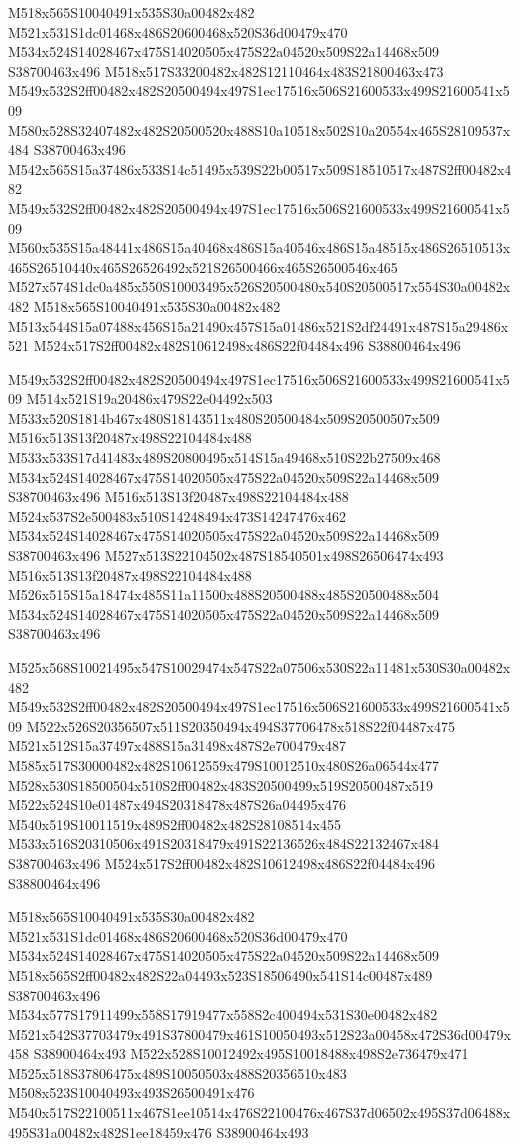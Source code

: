 \documentclass{article}
\begin{document}
\begin{multicols}{2}
M518x565S10040491x535S30a00482x482 M521x531S1dc01468x486S20600468x520S36d00479x470 M534x524S14028467x475S14020505x475S22a04520x509S22a14468x509 S38700463x496 M518x517S33200482x482S12110464x483S21800463x473 M549x532S2ff00482x482S20500494x497S1ec17516x506S21600533x499S21600541x509 M580x528S32407482x482S20500520x488S10a10518x502S10a20554x465S28109537x484 S38700463x496 M542x565S15a37486x533S14c51495x539S22b00517x509S18510517x487S2ff00482x482 M549x532S2ff00482x482S20500494x497S1ec17516x506S21600533x499S21600541x509 M560x535S15a48441x486S15a40468x486S15a40546x486S15a48515x486S26510513x465S26510440x465S26526492x521S26500466x465S26500546x465 M527x574S1dc0a485x550S10003495x526S20500480x540S20500517x554S30a00482x482 M518x565S10040491x535S30a00482x482 M513x544S15a07488x456S15a21490x457S15a01486x521S2df24491x487S15a29486x521 M524x517S2ff00482x482S10612498x486S22f04484x496 S38800464x496

M549x532S2ff00482x482S20500494x497S1ec17516x506S21600533x499S21600541x509 M514x521S19a20486x479S22e04492x503 M533x520S1814b467x480S18143511x480S20500484x509S20500507x509 M516x513S13f20487x498S22104484x488 M533x533S17d41483x489S20800495x514S15a49468x510S22b27509x468 M534x524S14028467x475S14020505x475S22a04520x509S22a14468x509 S38700463x496 M516x513S13f20487x498S22104484x488 M524x537S2e500483x510S14248494x473S14247476x462 M534x524S14028467x475S14020505x475S22a04520x509S22a14468x509 S38700463x496 M527x513S22104502x487S18540501x498S26506474x493 M516x513S13f20487x498S22104484x488 M526x515S15a18474x485S11a11500x488S20500488x485S20500488x504 M534x524S14028467x475S14020505x475S22a04520x509S22a14468x509 S38700463x496

M525x568S10021495x547S10029474x547S22a07506x530S22a11481x530S30a00482x482 M549x532S2ff00482x482S20500494x497S1ec17516x506S21600533x499S21600541x509 M522x526S20356507x511S20350494x494S37706478x518S22f04487x475 M521x512S15a37497x488S15a31498x487S2e700479x487 M585x517S30000482x482S10612559x479S10012510x480S26a06544x477 M528x530S18500504x510S2ff00482x483S20500499x519S20500487x519 M522x524S10e01487x494S20318478x487S26a04495x476 M540x519S10011519x489S2ff00482x482S28108514x455 M533x516S20310506x491S20318479x491S22136526x484S22132467x484 S38700463x496 M524x517S2ff00482x482S10612498x486S22f04484x496 S38800464x496

M518x565S10040491x535S30a00482x482 M521x531S1dc01468x486S20600468x520S36d00479x470 M534x524S14028467x475S14020505x475S22a04520x509S22a14468x509 M518x565S2ff00482x482S22a04493x523S18506490x541S14c00487x489 S38700463x496 M534x577S17911499x558S17919477x558S2c400494x531S30e00482x482 M521x542S37703479x491S37800479x461S10050493x512S23a00458x472S36d00479x458 S38900464x493 M522x528S10012492x495S10018488x498S2e736479x471 M525x518S37806475x489S10050503x488S20356510x483 M508x523S10040493x493S26500491x476 M540x517S22100511x467S1ee10514x476S22100476x467S37d06502x495S37d06488x495S31a00482x482S1ee18459x476 S38900464x493


\end{multicols}
\end{document}
